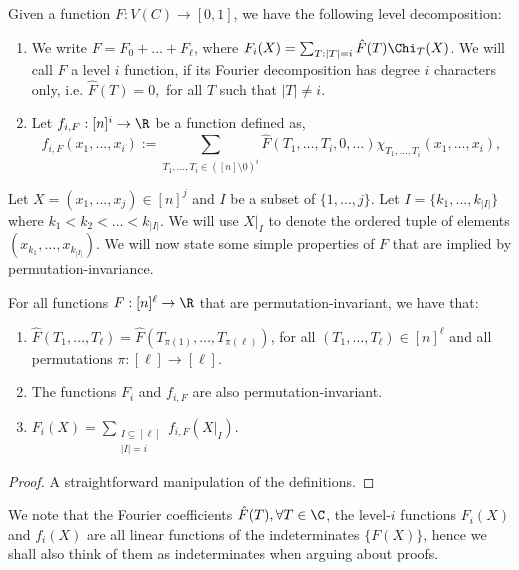 \begin{definition}\label{def:f_i}
Given a function $F\colon V(C)\to [0,1]$, we have the following level decomposition:
\begin{enumerate}
\item We write 
$F = F_0 + \ldots + F_\ell$,
where $F_i(X) = \sum_{T: |T| = i} \hat{F}(T) \Chi_T(X)$. We will call $F$ a level $i$ function, if its Fourier decomposition has degree $i$ characters only, i.e. $\hat{F}(T) = 0,$ for all $T$ such that $|T| \neq i$.
\item Let $f_{i,F}: [n]^i \rightarrow \R$ be a function defined as, 
$$f_{i,F}(x_1,\ldots,x_i) := \sum_{T_1,\ldots,T_i \in ([n] \setminus 0)^i}\hat{F}(T_1,\ldots,T_i,0,\ldots)\chi_{T_1,\ldots,T_i}(x_1,\ldots,x_i),$$ 
\end{enumerate}
\end{definition}



Let $X = (x_1,\ldots,x_{j}) \in [n]^{j}$ and $I$ be a subset of $\{1,\ldots,j\}$. Let $I = \{k_1,\ldots,k_{|I|}\}$ where $k_1 < k_2 < \ldots < k_{|I|}$. We will use $X|_I$ to denote the ordered tuple of elements $(x_{k_1},\ldots,x_{k_{|I|}})$. We will now state some simple properties of $F$ that are implied by permutation-invariance.

\begin{lemma}\label{lem:props}
For all functions $F:[n]^\ell \rightarrow \R$ that are permutation-invariant, we have that:
\begin{enumerate}
\item $\hat{F}(T_1,\ldots, T_\ell) = \hat{F}(T_{\pi(1)},\ldots,T_{\pi(\ell)})$, for all $(T_1,\ldots,T_\ell) \in [n]^\ell$ and all permutations $\pi:[\ell] \rightarrow [\ell]$.

\item The functions $F_i$ and $f_{i,F}$ are also permutation-invariant.

\item $F_i(X) = \sum\limits_{\substack{I \subseteq [\ell] \\ |I| = i}} f_{i,F}(X|_{I})$.
\end{enumerate}
\end{lemma}
\begin{proof}
A straightforward manipulation of the definitions.
\end{proof}

We note that the Fourier coefficients $\hat{F}(T), \forall T \in \C$, the level-$i$ functions $F_i(X)$ and $f_i(X)$ are all linear functions of the indeterminates $\{F(X)\}$,
hence we shall also think of them as indeterminates 
when arguing about \sos proofs.

